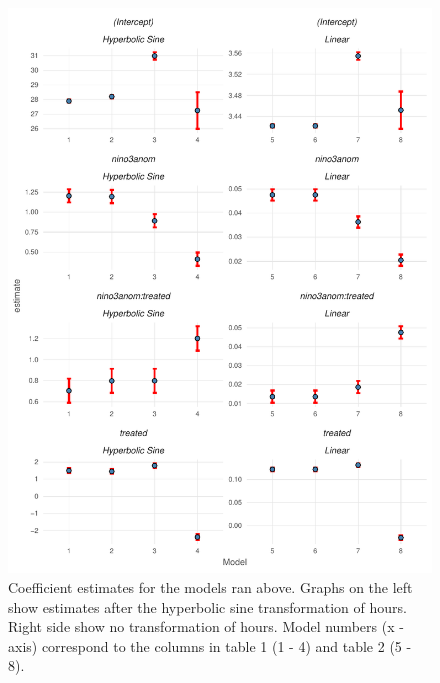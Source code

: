\documentclass[]{article}
\begin{document}
\begin{figure}
\centering
\includegraphics{Oremus_Villasenor-Derbez_files/figure-latex/unnamed-chunk-13-1.pdf}
\caption{Coefficient estimates for the models ran above. Graphs on the
left show estimates after the hyperbolic sine transformation of hours.
Right side show no transformation of hours. Model numbers (x - axis)
correspond to the columns in table 1 (1 - 4) and table 2 (5 - 8).}
\end{figure}

\clearpage

\renewcommand\refname{References}

\end{document}
